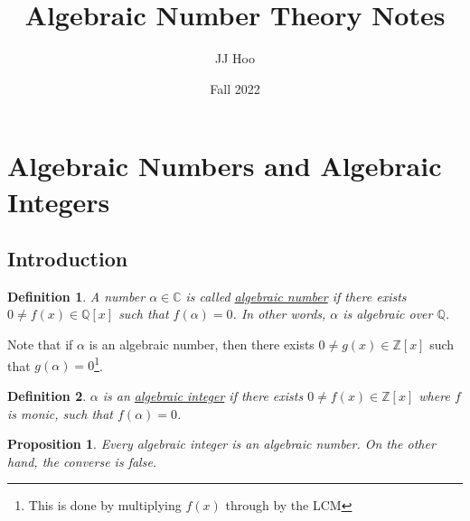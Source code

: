 \documentclass{article}
\title{Algebraic Number Theory Notes}
\author{JJ Hoo}
\date{Fall 2022}
\newcommand{\C}{\mathbb{C}}
\newcommand{\Q}{\mathbb{Q}}
\newcommand{\Z}{\mathbb{Z}}
\newtheorem{proposition}{Proposition}[subsection]
\newtheorem{definition}{Definition}[subsection]
\begin{document}
\maketitle
\tableofcontents
\newpage
\section{Algebraic Numbers and Algebraic Integers}
\subsection{Introduction}
\begin{definition}
A number $\alpha\in\C$ is called \underline{algebraic number} if there exists $0\neq f(x)\in\Q[x]$ such that $f(\alpha)=0$. In other words, $\alpha$ is algebraic over $\Q$.
\end{definition}
\noindent Note that if $\alpha$ is an algebraic number, then there exists $0\neq g(x)\in\Z[x]$ such that $g(\alpha)=0$\footnote{This is done by multiplying $f(x)$ through by the LCM}.
\begin{definition}
$\alpha$ is an \underline{algebraic integer} if there exists $0\neq f(x)\in \Z[x]$ where $f$ is monic, such that $f(\alpha)=0$.
\end{definition}
\begin{proposition}
Every algebraic integer is an algebraic number. On the other hand, the converse is false.
\end{proposition}
\end{document}
